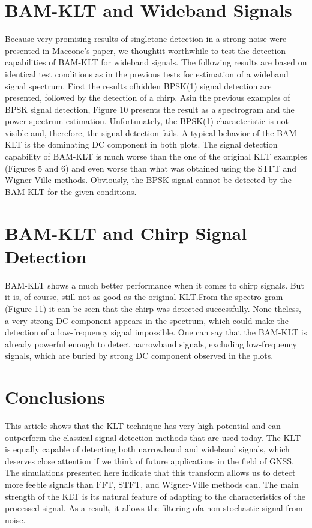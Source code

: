 \documentclass[12pt]{report}
\begin{document}
\section*{BAM-KLT and Wideband Signals}
Because very promising results of singletone detection in a strong noise were presented in Maccone's paper, we thoughtit worthwhile to test the detection capabilities of BAM-KLT for wideband signals. The following results are based on identical test conditions as in the previous tests for estimation of a wideband signal spectrum. First the results ofhidden BPSK(1) signal detection are presented, followed by the detection of a chirp.
Asin the previous examples of BPSK signal detection, Figure 10 presents the result as a spectrogram and the power spectrum estimation. Unfortunately, the BPSK(1) characteristic is not visible and, therefore, the signal detection fails.
A typical behavior of the BAM-KLT is the dominating DC component in both plots. The signal detection capability of BAM-KLT is much worse than the one of the original KLT examples (Figures 5 and 6) and even worse than what was obtained using the STFT and
Wigner-Ville methods. Obviously, the BPSK signal cannot be detected by the
BAM-KLT for the given conditions.
\section*{BAM-KLT and Chirp Signal Detection}
BAM-KLT shows a much better performance when it comes to chirp signals.
But it is, of course, still not as good as the original KLT.\@ From the spectro
gram (Figure 11) it can be seen that the chirp was detected successfully. None
theless, a very strong DC component appears in the spectrum, which could
make the detection of a low-frequency signal impossible. One can say that the
BAM-KLT is already powerful enough to detect narrowband signals, excluding
low-frequency signals, which are buried by strong DC component observed in the plots.
\section*{Conclusions}
This article shows that the KLT technique has very high potential and can outperform the classical signal detection methods that are used today. The KLT is equally capable of detecting both narrowband and wideband signals, which deserves close attention if
we think of future applications in the field of GNSS. The simulations presented here indicate that this transform allows us to detect more feeble signals than FFT, STFT, and Wigner-Ville methods can. The main strength of the KLT is its natural feature of adapting to the characteristics of the processed signal. As a result, it allows the filtering ofa non-stochastic signal from noise.
\end{document}
